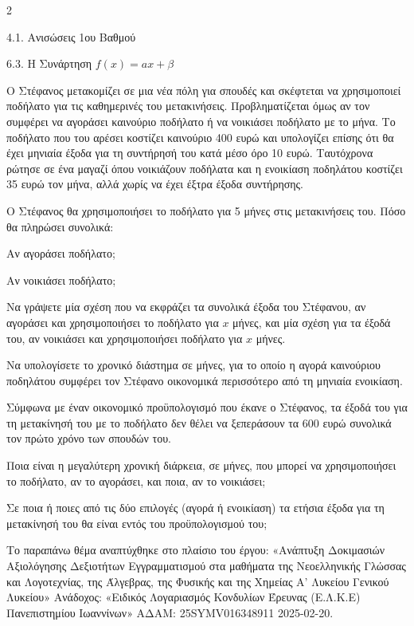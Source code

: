 \begin{ylh}{2}
    \item 4.1. Ανισώσεις 1ου Βαθμού
    \item 6.3. Η Συνάρτηση $f(x)=ax+\beta$
\end{ylh}
Ο Στέφανος μετακομίζει σε μια νέα πόλη για σπουδές και σκέφτεται να χρησιμοποιεί ποδήλατο για τις καθημερινές του μετακινήσεις. Προβληματίζεται όμως αν τον συμφέρει να αγοράσει καινούριο ποδήλατο ή να νοικιάσει ποδήλατο με το μήνα. Το ποδήλατο που του αρέσει κοστίζει καινούριο 400 ευρώ και υπολογίζει επίσης ότι θα έχει μηνιαία έξοδα για τη συντήρησή του κατά μέσο όρο 10 ευρώ. Ταυτόχρονα ρώτησε σε ένα μαγαζί όπου νοικιάζουν ποδήλατα και η ενοικίαση ποδηλάτου κοστίζει 35 ευρώ τον μήνα, αλλά χωρίς να έχει έξτρα έξοδα συντήρησης.

\begin{alist}
\item Ο Στέφανος θα χρησιμοποιήσει το ποδήλατο για 5 μήνες στις μετακινήσεις του. Πόσο θα πληρώσει συνολικά:


\begin{rlist}
\item
  Αν αγοράσει ποδήλατο;

\item
  Αν νοικιάσει ποδήλατο;
\end{rlist}
\item Να γράψετε μία σχέση που να εκφράζει τα συνολικά έξοδα του Στέφανου, αν αγοράσει και χρησιμοποιήσει το ποδήλατο για $x$ μήνες, και μία σχέση για τα έξοδά του, αν νοικιάσει και χρησιμοποιήσει ποδήλατο για $x$ μήνες.
\item Να υπολογίσετε το χρονικό διάστημα σε μήνες, για το οποίο η αγορά καινούριου ποδηλάτου συμφέρει τον Στέφανο οικονομικά περισσότερο από τη μηνιαία ενοικίαση.
\item Σύμφωνα με έναν οικονομικό προϋπολογισμό που έκανε ο Στέφανος, τα έξοδά του για τη μετακίνησή του με το ποδήλατο δεν θέλει να ξεπεράσουν τα 600 ευρώ συνολικά τον πρώτο χρόνο των σπουδών του.
\begin{rlist}
\item
  Ποια είναι η μεγαλύτερη χρονική διάρκεια, σε μήνες, που μπορεί να χρησιμοποιήσει το ποδήλατο, αν το αγοράσει, και ποια, αν το νοικιάσει;
\item
  Σε ποια ή ποιες από τις δύο επιλογές (αγορά ή ενοικίαση) τα ετήσια έξοδα για τη μετακίνησή του θα είναι εντός του προϋπολογισμού του;

{\footnotesize Το παραπάνω θέμα αναπτύχθηκε στο πλαίσιο του έργου: «Ανάπτυξη Δοκιμασιών Αξιολόγησης Δεξιοτήτων Εγγραμματισμού στα μαθήματα της Νεοελληνικής Γλώσσας και Λογοτεχνίας, της Άλγεβρας, της Φυσικής και της Χημείας Α' Λυκείου Γενικού Λυκείου» Ανάδοχος: «Ειδικός Λογαριασμός Κονδυλίων Έρευνας (Ε.Λ.Κ.Ε) Πανεπιστημίου Ιωαννίνων» ΑΔΑΜ: 25SYMV016348911 2025-02-20.}
\end{rlist}
\end{alist}

